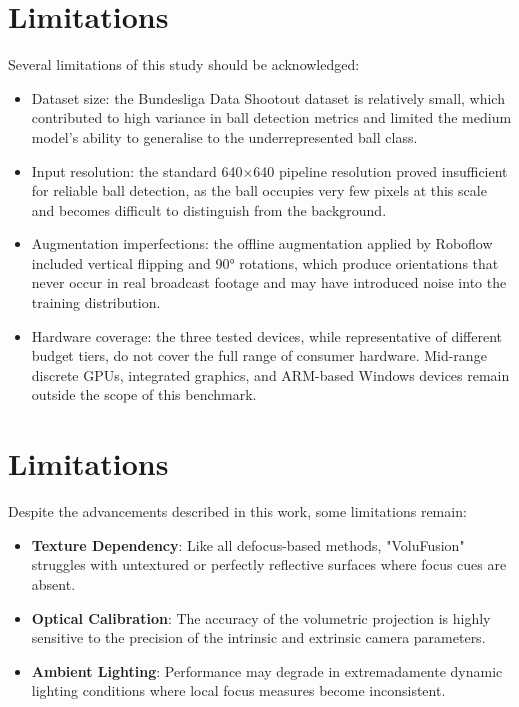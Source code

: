 \section{Limitations}
Several limitations of this study should be acknowledged:
\begin{itemize}
    \item Dataset size: the Bundesliga Data Shootout dataset is relatively small, which contributed to high variance in ball detection metrics and limited the medium model's ability to generalise to the underrepresented ball class.
    \item Input resolution: the standard 640×640 pipeline resolution proved insufficient for reliable ball detection, as the ball occupies very few pixels at this scale and becomes difficult to distinguish from the background.
    \item Augmentation imperfections: the offline augmentation applied by Roboflow included vertical flipping and 90° rotations, which produce orientations that never occur in real broadcast footage and may have introduced noise into the training distribution.
    \item Hardware coverage: the three tested devices, while representative of different budget tiers, do not cover the full range of consumer hardware. Mid-range discrete GPUs, integrated graphics, and ARM-based Windows devices remain outside the scope of this benchmark.
\end{itemize}


\section{Limitations}

Despite the advancements described in this work, some limitations remain:
\begin{itemize}
    \item \textbf{Texture Dependency}: Like all defocus-based methods, "VoluFusion" struggles with untextured or perfectly reflective surfaces where focus cues are absent.
    \item \textbf{Optical Calibration}: The accuracy of the volumetric projection is highly sensitive to the precision of the intrinsic and extrinsic camera parameters.
    \item \textbf{Ambient Lighting}: Performance may degrade in extremadamente dynamic lighting conditions where local focus measures become inconsistent.
\end{itemize}

